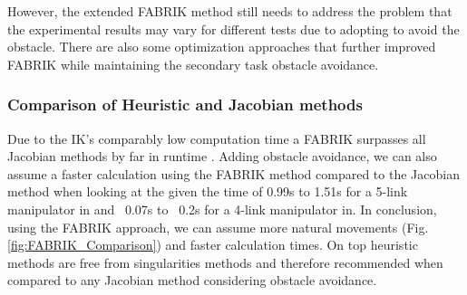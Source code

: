 \documentclass[conference]{IEEEtran}
\begin{document}
However, the extended FABRIK method still needs to address the problem that the experimental results may vary for different tests due to adopting to avoid the obstacle. There are also some optimization approaches\cite{wu_crrik_2022}\cite{xie_obstacle_2020} that further improved FABRIK while maintaining the secondary task obstacle avoidance.

\subsubsection{Comparison of Heuristic and Jacobian methods}\label{Comparison of Heuristic and Jacobian methods}
Due to the IK's comparably low computation time a FABRIK surpasses all Jacobian methods by far in runtime \cite{xie_obstacle_2020}. Adding obstacle avoidance, we can also assume a faster calculation using the FABRIK method compared to the Jacobian method when looking at the given the time of 0.99s to 1.51s for a 5-link manipulator in \cite{kelemen_novel_2018} and ~0.07s to ~0.2s for a 4-link manipulator in\cite{tao_extending_2021}. In conclusion, using the FABRIK approach, we can assume more natural movements (Fig.\ref{fig:FABRIK_Comparison}) and faster calculation times. On top heuristic methods are free from singularities methods and therefore recommended when compared to any Jacobian method considering obstacle avoidance.
\end{document}

